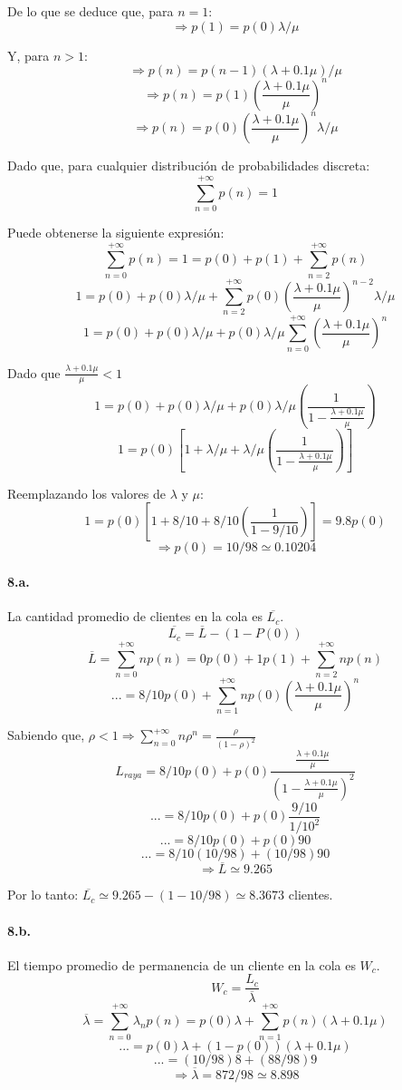 \documentclass{article}
\begin{document}
   De lo que se deduce que, para $n = 1$:
      $$\Rightarrow p(1) = p(0) \lambda / \mu$$

   Y, para $n > 1$:
      $$\Rightarrow p(n) = p(n - 1) (\lambda + 0.1 \mu ) / \mu$$
      $$\Rightarrow p(n) = p(1) (\frac{\lambda + 0.1 \mu}{\mu})^n$$
      $$\Rightarrow p(n) = p(0) (\frac{\lambda + 0.1 \mu}{\mu})^n \lambda / \mu$$

   Dado que, para cualquier distribución de probabilidades discreta:
      $$\sum_{n=0}^{+\infty} p(n) = 1$$

   Puede obtenerse la siguiente expresión:
      $$\sum_{n=0}^{+\infty} p(n) = 1 = p(0) + p(1) + \sum_{n=2}^{+\infty} p(n)$$
      $$1 = p(0) + p(0) \lambda / \mu + \sum_{n=2}^{+\infty} p(0) (\frac{\lambda + 0.1 \mu}{\mu})^{n-2} \lambda / \mu$$
      $$1 = p(0) + p(0) \lambda / \mu + p(0) \lambda / \mu \sum_{n=0}^{+\infty} (\frac{\lambda + 0.1 \mu}{\mu})^n$$

   Dado que $\frac{\lambda + 0.1 \mu}{\mu} < 1$
      $$1 = p(0) + p(0) \lambda / \mu + p(0) \lambda / \mu (\frac{1}{1 - \frac{\lambda + 0.1\mu}{\mu}})$$
      $$1 = p(0) [1 + \lambda / \mu + \lambda / \mu (\frac{1}{1 - \frac{\lambda + 0.1\mu}{\mu}})]$$

   Reemplazando los valores de $\lambda$ y $\mu$:
      $$1 = p(0) [1 + 8/10 + 8/10 (\frac{1}{1 - 9/10})] = 9.8 p(0)$$
      $$\Rightarrow p(0) = 10 / 98 \simeq 0.10204$$

   \paragraph{8.a.} La cantidad promedio de clientes en la cola es $ \overline{L_{c}}$.
      $$ \overline{L_{c}} = \overline{L} - (1 - P(0))$$
      $$\overline{L} = \sum_{n=0}^{+\infty} n p(n) = 0 p(0) + 1 p(1) + \sum_{n=2}^{+\infty} n p(n)$$
      $$... = 8/10 p(0) + \sum_{n=1}^{+\infty} n p(0) (\frac{\lambda + 0.1 \mu}{\mu})^n$$

      Sabiendo que, $\rho < 1 \Rightarrow \sum_{n=0}^{+\infty} n \rho^n = \frac{\rho}{(1- \rho)^2}$
      $$L_{raya} = 8/10 p(0) + p(0) \frac{\frac{\lambda + 0.1 \mu}{\mu}}{(1 - \frac{\lambda + 0.1 \mu}{\mu})^2}$$
      $$... = 8/10 p(0) + p(0) \frac{9/10}{1/10^2}$$
      $$... = 8/10 p(0) + p(0) 90$$
      $$... = 8/10 (10/98) + (10/98) 90$$
      $$\Rightarrow \overline{L} \simeq 9.265$$

      Por lo tanto: $\overline{L_{c}} \simeq 9.265 - (1-10/98) \simeq 8.3673$ clientes.


   \paragraph{8.b.} El tiempo promedio de permanencia de un cliente en la cola es $W_c$.
      $$W_c = \frac{L_c}{\overline{\lambda}}$$
      $$\overline{\lambda} = \sum_{n=0}^{+\infty} \lambda_n p(n) = p(0) \lambda + \sum_{n=1}^{+\infty} p(n) (\lambda + 0.1 \mu) $$
      $$... = p(0) \lambda + (1 - p(0)) (\lambda + 0.1 \mu) $$
      $$... = (10/98) 8 + (88/98) 9$$
      $$\Rightarrow \overline{\lambda} = 872/98 \simeq 8.898$$
\end{document}
